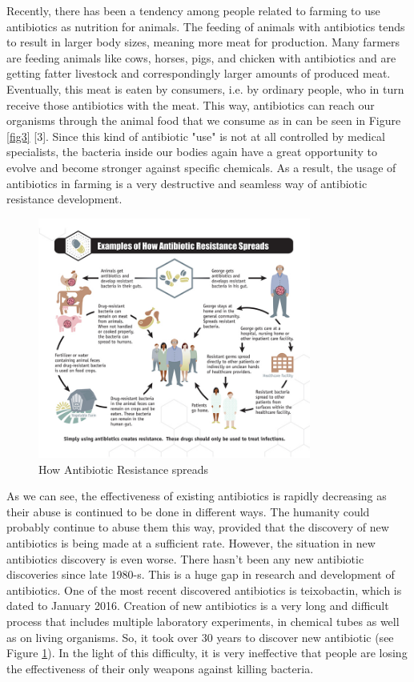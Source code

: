 Recently, there has been a tendency among people related to farming to use antibiotics as nutrition for animals. The feeding of animals with antibiotics tends to result in larger body sizes, meaning more meat for production. Many farmers are feeding animals like cows, horses, pigs, and chicken with antibiotics and are getting fatter livestock and correspondingly larger amounts of produced meat. Eventually, this meat is eaten by consumers, i.e. by ordinary people, who in turn receive those antibiotics with the meat. This way, antibiotics can reach our organisms through the animal food that we consume as in can be seen in Figure \ref{fig3} [3]. Since this kind of antibiotic "use" is not at all controlled by medical specialists, the bacteria inside our bodies again have a great opportunity to evolve and become stronger against specific chemicals. As a result, the usage of antibiotics in farming is a very destructive and seamless way of antibiotic resistance development.

\begin{figure}[H]
  \centering
  \includegraphics[width=0.8\textwidth]{img/Fig4}
  \caption{How Antibiotic Resistance spreads}
  \label{fig4}
\end{figure}

As we can see, the effectiveness of existing antibiotics is rapidly decreasing as their abuse is continued to be done in different ways. The humanity could probably continue to abuse them this way, provided that the discovery of new antibiotics is being made at a sufficient rate. However, the situation in new antibiotics discovery is even worse. There hasn't been any new antibiotic discoveries since late 1980-s. This is a huge gap in research and development of antibiotics. One of the most recent discovered antibiotics is teixobactin, which is dated to January 2016. Creation of new antibiotics is a very long and difficult process that includes multiple laboratory experiments, in chemical tubes as well as on living organisms. So, it took over 30 years to discover new antibiotic (see Figure \ref{fig4}). In the light of this difficulty, it is very ineffective that people are losing the effectiveness of their only weapons against killing bacteria.

